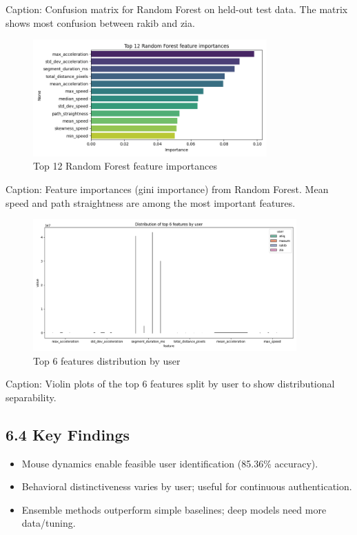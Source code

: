 \documentclass[
  11pt,
  a4paper,
]{article}
\providecommand{\tightlist}{%
  \setlength{\itemsep}{0pt}\setlength{\parskip}{0pt}}
\begin{document}
Caption: Confusion matrix for Random Forest on held-out test data. The
matrix shows most confusion between rakib and zia.

\begin{figure}
\centering
\includegraphics[width=0.8\textwidth,height=\textheight]{figures/rf_top12_feature_importances.png}
\caption{Top 12 Random Forest feature importances}
\end{figure}

Caption: Feature importances (gini importance) from Random Forest. Mean
speed and path straightness are among the most important features.

\begin{figure}
\centering
\includegraphics[width=0.9\textwidth,height=\textheight]{figures/top6_feature_violin_by_user.png}
\caption{Top 6 features distribution by user}
\end{figure}

Caption: Violin plots of the top 6 features split by user to show
distributional separability.

\subsection{6.4 Key Findings}\label{key-findings}

\begin{itemize}
\tightlist
\item
  Mouse dynamics enable feasible user identification (85.36\% accuracy).
\item
  Behavioral distinctiveness varies by user; useful for continuous
  authentication.
\item
  Ensemble methods outperform simple baselines; deep models need more
  data/tuning.
\end{itemize}
\end{document}
